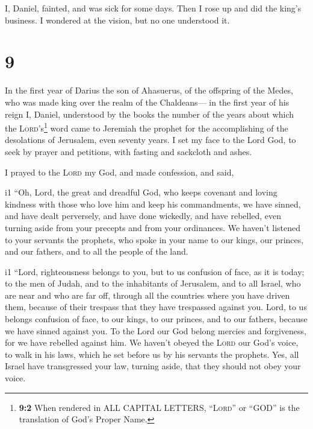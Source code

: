  I, Daniel, fainted, and was sick for some days. Then I
rose up and did the king's business. I wondered at the vision, but no
one understood it.

\hypertarget{section-8}{%
\section{9}\label{section-8}}

 In the first year of Darius the son of Ahasuerus, of the
offspring of the Medes, who was made king over the realm of the
Chaldeans---  in the first year of his reign I, Daniel,
understood by the books the number of the years about which the
\textsc{Lord}'s\footnote{\textbf{9:2} When rendered in ALL CAPITAL
  LETTERS, ``\textsc{Lord}'' or ``GOD'' is the translation of God's
  Proper Name.} word came to Jeremiah the prophet for the accomplishing
of the desolations of Jerusalem, even seventy years.  I
set my face to the Lord God, to seek by prayer and petitions, with
fasting and sackcloth and ashes.

 I prayed to the \textsc{Lord} my God, and made
confession, and said,

i1 ``Oh, Lord, the great and dreadful God, who keeps covenant and loving
kindness with those who love him and keep his commandments,
 we have sinned, and have dealt perversely, and have done
wickedly, and have rebelled, even turning aside from your precepts and
from your ordinances.  We haven't listened to your
servants the prophets, who spoke in your name to our kings, our princes,
and our fathers, and to all the people of the land.

i1  ``Lord, righteousness belongs to you, but to us
confusion of face, as it is today; to the men of Judah, and to the
inhabitants of Jerusalem, and to all Israel, who are near and who are
far off, through all the countries where you have driven them, because
of their trespass that they have trespassed against you. 
Lord, to us belongs confusion of face, to our kings, to our princes, and
to our fathers, because we have sinned against you.  To
the Lord our God belong mercies and forgiveness, for we have rebelled
against him.  We haven't obeyed the \textsc{Lord} our
God's voice, to walk in his laws, which he set before us by his servants
the prophets.  Yes, all Israel have transgressed your
law, turning aside, that they should not obey your voice.

